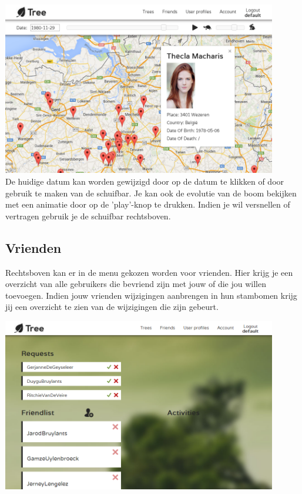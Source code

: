 \documentclass[pdftex,a4paper,12pt,twoside]{report}
\begin{document}
\includegraphics[width=12cm]{images/web_timemachine.png}\\[.5cm]
De huidige datum kan worden gewijzigd door op de datum te klikken of door gebruik te maken van de schuifbar. Je kan ook de evolutie van de boom bekijken met een animatie door op de 'play'-knop te drukken. Indien je wil versnellen of vertragen gebruik je de schuifbar rechtsboven.

\subsection{Vrienden}
Rechtsboven kan er in de menu gekozen worden voor vrienden. Hier krijg je een overzicht van alle gebruikers die bevriend zijn met jouw of die jou willen toevoegen. Indien jouw vrienden wijzigingen aanbrengen in hun stambomen krijg jij een overzicht te zien van de wijzigingen die zijn gebeurt.

\includegraphics[width=12cm]{images/web_friends.png}\\[.5cm]
\end{document}
